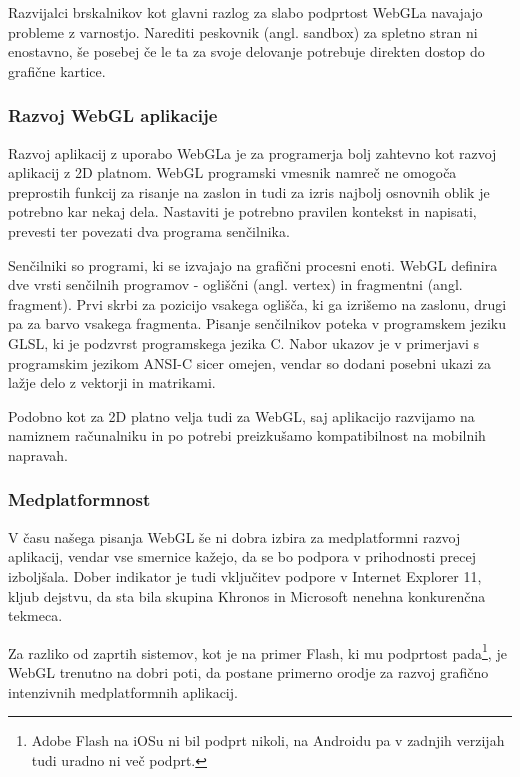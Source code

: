 Razvijalci brskalnikov kot glavni razlog za slabo podprtost WebGLa navajajo probleme z varnostjo. Narediti peskovnik (angl. sandbox) za spletno stran ni enostavno, še posebej če le ta za svoje delovanje potrebuje direkten dostop do grafične kartice.

\subsubsection{Razvoj WebGL aplikacije}

Razvoj aplikacij z uporabo WebGLa je za programerja bolj zahtevno kot razvoj aplikacij z 2D platnom. WebGL programski vmesnik namreč ne omogoča preprostih funkcij za risanje na zaslon in tudi za izris najbolj osnovnih oblik je potrebno kar nekaj dela. Nastaviti je potrebno pravilen kontekst in napisati, prevesti ter povezati dva programa senčilnika. 

Senčilniki so programi, ki se izvajajo na grafični procesni enoti. WebGL definira dve vrsti senčilnih programov - ogliščni (angl. vertex) in fragmentni (angl. fragment). Prvi skrbi za pozicijo vsakega oglišča, ki ga izrišemo na zaslonu, drugi pa za barvo vsakega fragmenta. Pisanje senčilnikov poteka v programskem jeziku GLSL, ki je podzvrst programskega jezika C. Nabor ukazov je v primerjavi s programskim jezikom ANSI-C sicer omejen, vendar so dodani posebni ukazi za lažje delo z vektorji in matrikami.

Podobno kot za 2D platno velja tudi za WebGL, saj aplikacijo razvijamo na namiznem računalniku in po potrebi preizkušamo kompatibilnost na mobilnih napravah.

\subsubsection{Medplatformnost}

V času našega pisanja WebGL še ni dobra izbira za medplatformni razvoj aplikacij, vendar vse smernice kažejo, da se bo podpora v prihodnosti precej izboljšala. Dober indikator je tudi vključitev podpore v Internet Explorer 11, kljub dejstvu, da sta bila skupina Khronos in Microsoft nenehna konkurenčna tekmeca.

Za razliko od zaprtih sistemov, kot je na primer Flash, ki mu podprtost pada\footnote{Adobe Flash na iOSu ni bil podprt nikoli, na Androidu pa v zadnjih verzijah tudi uradno ni več podprt.}, je WebGL trenutno na dobri poti, da postane primerno orodje za razvoj grafično intenzivnih medplatformnih aplikacij.

